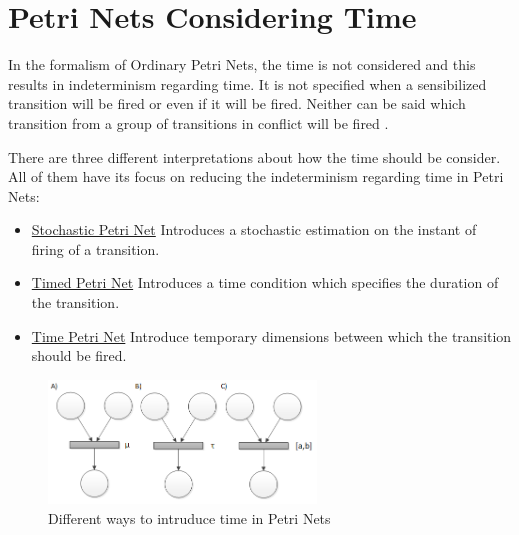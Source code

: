 \section{Petri Nets Considering Time}
	
	In the formalism of Ordinary Petri Nets, the time is not considered and this results in 
	indeterminism regarding time. It is not specified when a sensibilized transition will be fired 
	or even if it will be fired. Neither can be said which transition from a group of transitions in
	 conflict will be fired \cite{garcia_izquierdo}.
	
	There are three different interpretations about how the time should be consider. All of them 
	have its focus on reducing the indeterminism regarding time in Petri Nets: 
	\begin{itemize}
	  	\renewcommand{\theenumi}{\Alph{enumi}}
	  	\item \underline{Stochastic Petri Net}
			Introduces a stochastic estimation on the instant of firing of a transition.
		\item \underline{Timed Petri Net}
			Introduces a time condition which specifies the duration of the transition.
		\item \underline{Time Petri Net}
			Introduce temporary dimensions between which the transition should be fired.
	\end{itemize}
	
	\begin{figure}[h]
		\centering
		\includegraphics[width=2.8in]{./img/Petri16}
		\caption{Different ways to intruduce time in Petri Nets}
		\label{fig:Petri16}
	\end{figure}
	
